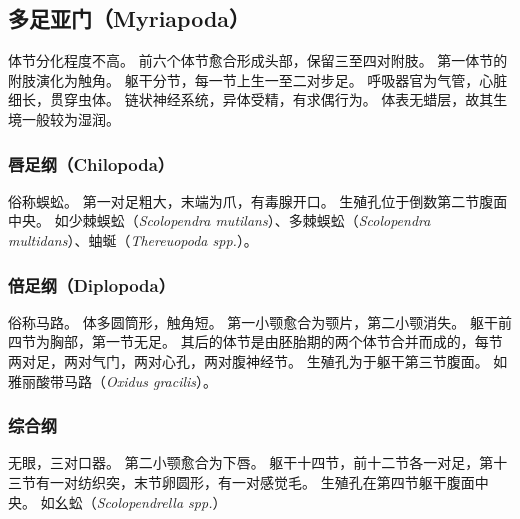 \documentclass[11pt]{article}
\begin{document}
\subsection{多足亚门（Myriapoda）}
体节分化程度不高。
前六个体节愈合形成头部，保留三至四对附肢。
第一体节的附肢演化为触角。
躯干分节，每一节上生一至二对步足。
呼吸器官为气管，心脏细长，贯穿虫体。
链状神经系统，异体受精，有求偶行为。
体表无蜡层，故其生境一般较为湿润。

\subsubsection{唇足纲（Chilopoda）}
俗称蜈蚣。
第一对足粗大，末端为爪，有毒腺开口。
生殖孔位于倒数第二节腹面中央。
如少棘蜈蚣（\textit{Scolopendra mutilans}）、多棘蜈蚣（\textit{Scolopendra multidans}）、蚰蜒（\textit{Thereuopoda spp.}）。

\subsubsection{倍足纲（Diplopoda）}
俗称马路。
体多圆筒形，触角短。
第一小颚愈合为颚片，第二小颚消失。
躯干前四节为胸部，第一节无足。
其后的体节是由胚胎期的两个体节合并而成的，每节两对足，两对气门，两对心孔，两对腹神经节。
生殖孔为于躯干第三节腹面。
如雅丽酸带马路（\textit{Oxidus gracilis}）。

\subsubsection{综合纲}
无眼，三对口器。
第二小颚愈合为下唇。
躯干十四节，前十二节各一对足，第十三节有一对纺织突，末节卵圆形，有一对感觉毛。
生殖孔在第四节躯干腹面中央。
如幺蚣（\textit{Scolopendrella spp.}）
\end{document}
